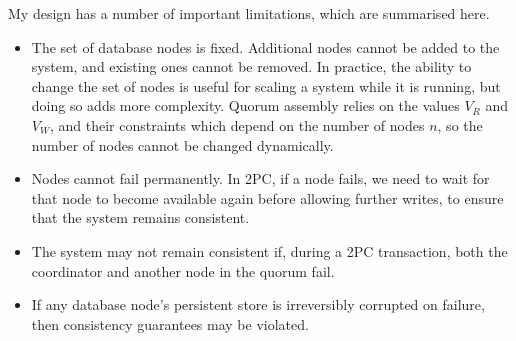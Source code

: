 \documentclass[12pt,a4paper]{article}
\begin{document}
My design has a number of important limitations, which are summarised here.

\begin{itemize}
  \item
  The set of database nodes is fixed. Additional nodes cannot be added to the system, and existing ones cannot be removed. In practice, the ability to change the set of nodes is useful for scaling a system while it is running, but doing so adds more complexity. Quorum assembly relies on the values $V_R$ and $V_W$, and their constraints which depend on the number of nodes $n$, so the number of nodes cannot be changed dynamically.

  \item
  Nodes cannot fail permanently. In 2PC, if a node fails, we need to wait for that node to become available again before allowing further writes, to ensure that the system remains consistent.

  \item
  The system may not remain consistent if, during a 2PC transaction, both the coordinator and another node in the quorum fail.

  \item
  If any database node's persistent store is irreversibly corrupted on failure, then consistency guarantees may be violated.

\end{itemize}
\end{document}
